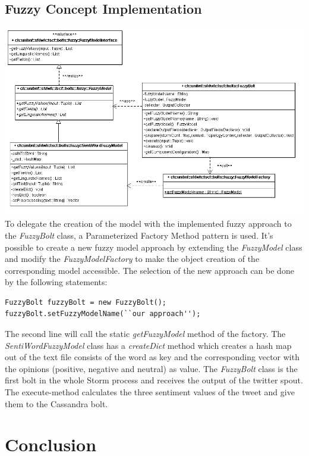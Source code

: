 \documentclass[a4paper]{article}
\begin{document}
\subsection{Fuzzy Concept Implementation}
\includegraphics[scale=0.5]{images/FuzzyModelFactory_Diagram.png}\\
To delegate the creation of the model with the implemented fuzzy approach to the \textit{FuzzyBolt} class, a Parameterized Factory Method pattern is used. It's possible to create a new fuzzy model approach by extending the \textit{FuzzyModel} class and modify the \textit{FuzzyModelFactory} to make the object creation of the corresponding model accessible. The selection of the new approach can be done by the following statements:
\lstset{language=Java}
\begin{lstlisting}
FuzzyBolt fuzzyBolt = new FuzzyBolt();
fuzzyBolt.setFuzzyModelName(``our approach'');
\end{lstlisting}
The second line will call the static \textit{getFuzzyModel} method of the factory.
The \textit{SentiWordFuzzyModel} class has a \textit{createDict} method which creates a hash map out of the text file consists of the word as key and the corresponding vector with the opinions (positive, negative and neutral) as value.
The \textit{FuzzyBolt} class is the first bolt in the whole Storm process and receives the output of the twitter spout. The execute-method calculates the three sentiment values of the tweet and give them to the Cassandra bolt.

\section{Conclusion}
\end{document}
